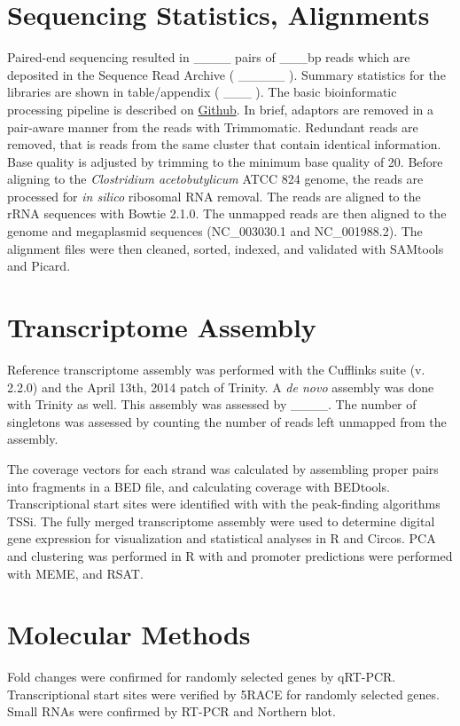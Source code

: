 \section{Sequencing Statistics, Alignments}
Paired-end sequencing resulted in ____ pairs of ___bp reads which are deposited in the Sequence Read Archive ( _____ ). Summary statistics for the libraries are shown in table/appendix ( ___ ). The basic bioinformatic processing pipeline is described on \href{https://github.com/mrals89/NGS_scripts/tree/paired}{Github}. In brief, adaptors are removed in a pair-aware manner from the reads with Trimmomatic. Redundant reads are removed, that is reads from the same cluster that contain identical information. Base quality is adjusted by trimming to the minimum base quality of 20. Before aligning to the \textit{Clostridium acetobutylicum} ATCC 824 genome, the reads are processed for \textit{in silico} ribosomal RNA removal. The reads are aligned to the rRNA sequences with Bowtie 2.1.0. The unmapped reads are then aligned to the genome and megaplasmid sequences (NC_003030.1 and NC_001988.2). The alignment files were then cleaned, sorted, indexed, and validated with SAMtools and Picard.

\section{Transcriptome Assembly}
Reference transcriptome assembly was performed with the Cufflinks suite (v. 2.2.0) and the April 13th, 2014 patch of Trinity. A \textit{de novo} assembly was done with Trinity as well. This assembly was assessed by ____. The number of singletons was assessed by counting the number of reads left unmapped from the assembly.

The coverage vectors for each strand was calculated by assembling proper pairs into fragments in a BED file, and calculating coverage with BEDtools. Transcriptional start sites were identified with with the peak-finding algorithms TSSi. The fully merged transcriptome assembly were used to determine digital gene expression for visualization and statistical analyses in R and Circos. PCA and clustering was performed in R with          and promoter predictions were performed with MEME, and RSAT.
\section{Molecular Methods}
Fold changes were confirmed for randomly selected genes by qRT-PCR. Transcriptional start sites were verified by 5\textprime  RACE for randomly selected genes. Small RNAs were confirmed by RT-PCR and Northern blot.
